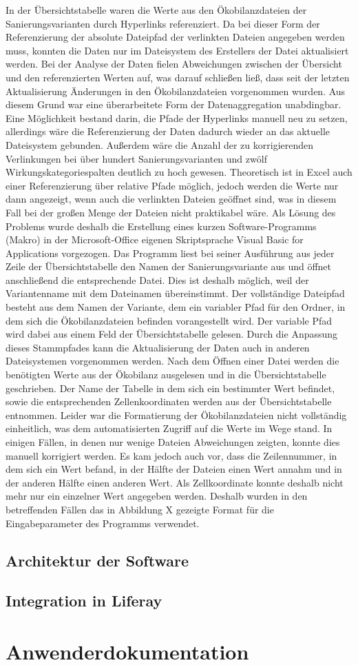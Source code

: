 In der Übersichtstabelle waren die Werte aus den Ökobilanzdateien der Sanierungsvarianten durch Hyperlinks referenziert. Da bei dieser Form der Referenzierung der absolute Dateipfad der verlinkten Dateien angegeben werden muss, konnten die Daten nur im Dateisystem des Erstellers der Datei aktualisiert werden. Bei der Analyse der Daten fielen Abweichungen zwischen der Übersicht und den referenzierten Werten auf, was darauf schließen ließ, dass seit der letzten Aktualisierung Änderungen in den Ökobilanzdateien vorgenommen wurden. Aus diesem Grund war eine überarbeitete Form der Datenaggregation unabdingbar. Eine Möglichkeit bestand darin, die Pfade der Hyperlinks manuell neu zu setzen, allerdings wäre die Referenzierung der Daten dadurch wieder an das aktuelle Dateisystem gebunden. Außerdem wäre die Anzahl der zu korrigierenden Verlinkungen bei über hundert Sanierungsvarianten und zwölf Wirkungskategoriespalten deutlich zu hoch gewesen. Theoretisch ist in Excel auch einer Referenzierung über relative Pfade möglich, jedoch werden die Werte nur dann angezeigt, wenn auch die verlinkten Dateien geöffnet sind, was in diesem Fall bei der großen Menge der Dateien nicht praktikabel wäre. Als Lösung des Problems wurde deshalb die Erstellung eines kurzen Software-Programms (Makro) in der Microsoft-Office eigenen Skriptsprache Visual Basic for Applications vorgezogen. Das Programm liest bei seiner Ausführung aus jeder Zeile der Übersichtstabelle den Namen der Sanierungsvariante aus und öffnet anschließend die entsprechende Datei. Dies ist deshalb möglich, weil der Variantenname mit dem Dateinamen übereinstimmt. Der vollständige Dateipfad besteht aus dem Namen der Variante, dem ein variabler Pfad für den Ordner, in dem sich die Ökobilanzdateien befinden vorangestellt wird. Der variable Pfad wird dabei aus einem Feld der Übersichtstabelle gelesen. Durch die Anpassung dieses Stammpfades kann die Aktualisierung der Daten auch in anderen Dateisystemen vorgenommen werden. Nach dem Öffnen einer Datei werden die benötigten Werte aus der Ökobilanz ausgelesen und in die Übersichtstabelle geschrieben. Der Name der Tabelle in dem sich ein bestimmter Wert befindet, sowie die entsprechenden Zellenkoordinaten werden aus der Übersichtstabelle entnommen. Leider war die Formatierung der Ökobilanzdateien nicht vollständig einheitlich, was dem automatisierten Zugriff auf die Werte im Wege stand. In einigen Fällen, in denen nur wenige Dateien Abweichungen zeigten, konnte dies manuell korrigiert werden. Es kam jedoch auch vor, dass die Zeilennummer, in dem sich ein Wert befand, in der Hälfte der Dateien einen Wert annahm und in der anderen Hälfte einen anderen Wert. Als Zellkoordinate konnte deshalb nicht mehr nur ein einzelner Wert angegeben werden. Deshalb wurden in den betreffenden Fällen das in Abbildung X gezeigte Format für die Eingabeparameter des Programms verwendet.  
\section{Architektur der Software}
\section{Integration in Liferay}

\chapter{Anwenderdokumentation}

